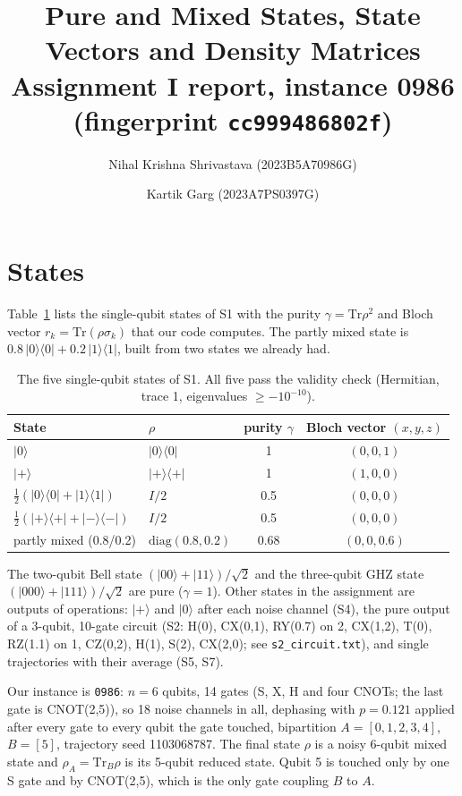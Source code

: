 \documentclass[10pt]{article}
\title{\vspace{-1.2cm}Pure and Mixed States, State Vectors and Density Matrices\\[2pt]
\large Assignment I report, instance 0986 (fingerprint \texttt{cc999486802f})}
\author{Nihal Krishna Shrivastava (2023B5A70986G) \and Kartik Garg (2023A7PS0397G)}
\date{}
\newcommand{\tr}{\mathrm{Tr}}
\begin{document}
\maketitle
\vspace{-0.8cm}

\section{States}
Table~\ref{tab:states} lists the single-qubit states of S1 with the purity $\gamma=\tr\rho^2$ and Bloch vector $r_k=\tr(\rho\sigma_k)$ that our code computes. The partly mixed state is $0.8\,|0\rangle\langle0|+0.2\,|1\rangle\langle1|$, built from two states we already had.
\begin{table}[h]
\centering\small
\begin{tabular}{llcc}
\toprule
State & $\rho$ & purity $\gamma$ & Bloch vector $(x,y,z)$\\
\midrule
$|0\rangle$ & $|0\rangle\langle0|$ & 1 & $(0,0,1)$\\
$|+\rangle$ & $|+\rangle\langle+|$ & 1 & $(1,0,0)$\\
$\tfrac12(|0\rangle\langle0|+|1\rangle\langle1|)$ & $I/2$ & 0.5 & $(0,0,0)$\\
$\tfrac12(|+\rangle\langle+|+|-\rangle\langle-|)$ & $I/2$ & 0.5 & $(0,0,0)$\\
partly mixed (0.8/0.2) & $\mathrm{diag}(0.8,0.2)$ & 0.68 & $(0,0,0.6)$\\
\bottomrule
\end{tabular}
\caption{The five single-qubit states of S1. All five pass the validity check (Hermitian, trace 1, eigenvalues $\ge-10^{-10}$).}\label{tab:states}
\end{table}

The two-qubit Bell state $(|00\rangle+|11\rangle)/\sqrt2$ and the three-qubit GHZ state $(|000\rangle+|111\rangle)/\sqrt2$ are pure ($\gamma=1$). Other states in the assignment are outputs of operations: $|+\rangle$ and $|0\rangle$ after each noise channel (S4), the pure output of a 3-qubit, 10-gate circuit (S2: H(0), CX(0,1), RY(0.7) on 2, CX(1,2), T(0), RZ(1.1) on 1, CZ(0,2), H(1), S(2), CX(2,0); see \texttt{s2\_circuit.txt}), and single trajectories with their average (S5, S7).

Our instance is \texttt{0986}: $n=6$ qubits, 14 gates (S, X, H and four CNOTs; the last gate is CNOT(2,5)), so 18 noise channels in all, dephasing with $p=0.121$ applied after every gate to every qubit the gate touched, bipartition $A=[0,1,2,3,4]$, $B=[5]$, trajectory seed 1103068787. The final state $\rho$ is a noisy 6-qubit mixed state and $\rho_A=\tr_B\rho$ is its 5-qubit reduced state. Qubit 5 is touched only by one S gate and by CNOT(2,5), which is the only gate coupling $B$ to $A$.
\end{document}
